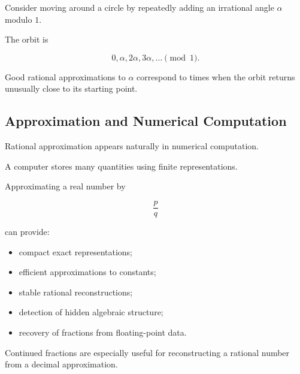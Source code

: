 Consider moving around a circle by repeatedly adding an irrational angle
\(\alpha\) modulo \(1\).

The orbit is

\[ 0,\alpha,2\alpha,3\alpha,\ldots\pmod1. \]

\begin{centereddiagram}
\end{centereddiagram}

Good rational approximations to \(\alpha\) correspond to times when the orbit
returns unusually close to its starting point.

\subsection{Approximation and Numerical Computation}
\label{subsec:diophantine-numerical-computation}

Rational approximation appears naturally in numerical computation.

A computer stores many quantities using finite representations.

Approximating a real number by

\[ \frac pq \]

can provide:

\begin{itemize}
    \item compact exact representations;
    \item efficient approximations to constants;
    \item stable rational reconstructions;
    \item detection of hidden algebraic structure;
    \item recovery of fractions from floating-point data.
\end{itemize}

Continued fractions are especially useful for reconstructing a rational
number from a decimal approximation.

